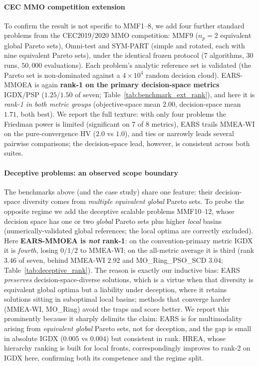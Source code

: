 \paragraph{CEC MMO competition extension} To confirm the result is not specific to MMF1--8,
we add four further standard problems from the CEC2019/2020 MMO competition: MMF9 ($n_p{=}2$
equivalent global Pareto sets), Omni-test and SYM-PART (simple and rotated, each with nine
equivalent Pareto sets), under the identical frozen protocol (7 algorithms, 30 runs, $50{,}000$
evaluations). Each problem's analytic reference set is validated (the Pareto set is
non-dominated against a $4{\times}10^4$ random decision cloud). EARS-MMOEA is again
\textbf{rank-1 on the primary decision-space metrics} IGDX/PSP ($1.25$/$1.50$ of seven;
Table~\ref{tab:benchmark_ext_rank}), and here it is \emph{rank-1 in both metric groups}
(objective-space mean $2.00$, decision-space mean $1.71$, both best). We report the full
texture: with only four problems the Friedman power is limited (significant on $7$ of $8$ metrics),
EARS trails MMEA-WI on the pure-convergence HV ($2.0$ vs $1.0$), and ties or narrowly leads several
pairwise comparisons; the decision-space lead, however, is consistent across both suites.



\paragraph{Deceptive problems: an observed scope boundary} The benchmarks above (and the
case study) share one feature: their decision-space diversity comes from \emph{multiple
equivalent global} Pareto sets. To probe the opposite regime we add the deceptive scalable
problems MMF10--12, whose decision space has one or two \emph{global} Pareto sets plus higher
\emph{local} basins (numerically-validated global references; the local optima are correctly
excluded). Here \textbf{EARS-MMOEA is \emph{not} rank-1}: on the convention-primary metric IGDX it is
\emph{fourth}, losing $0/1/2$ to MMEA-WI; on the all-metric average it is third
(rank $3.46$ of seven, behind MMEA-WI $2.92$ and MO\_Ring\_PSO\_SCD $3.04$;
Table~\ref{tab:deceptive_rank}). The reason is exactly our inductive
bias: EARS \emph{preserves} decision-space-diverse solutions, which is a virtue when that
diversity is equivalent global optima but a liability under deception, where it retains
solutions sitting in suboptimal local basins; methods that converge harder (MMEA-WI, MO\_Ring)
avoid the traps and score better. We report this prominently because it sharply delimits the
claim: EARS is for multimodality arising from \emph{equivalent global} Pareto sets, not for
deception, and the gap is small in absolute IGDX ($0.005$ vs $0.004$) but consistent in rank.
HREA, whose hierarchy ranking is built for local fronts, correspondingly improves to rank-2 on
IGDX here, confirming both its competence and the regime split.


